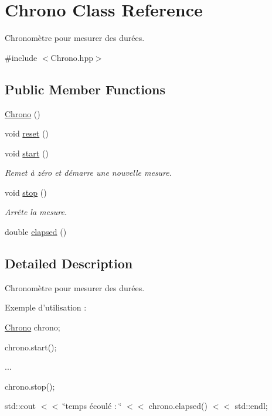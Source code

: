 \hypertarget{classChrono}{\section{Chrono Class Reference}
\label{classChrono}
}


Chronomètre pour mesurer des durées.  




{\ttfamily \#include $<$Chrono.\+hpp$>$}

\subsection*{Public Member Functions}
\begin{DoxyCompactItemize}
\item 
\hyperlink{classChrono_a3ac5e047174f389e7bd8aae71c6b5e8c}{Chrono} ()
\item 
void \hyperlink{classChrono_a027be23720616639bc610a98c53740ea}{reset} ()
\item 
void \hyperlink{classChrono_a25fa21b48125a6a811638aa6b8dcdbe8}{start} ()
\begin{DoxyCompactList}\small\item\em Remet à zéro et démarre une nouvelle mesure. \end{DoxyCompactList}\item 
void \hyperlink{classChrono_a7b8db2281381eac23da35a414077f3fd}{stop} ()
\begin{DoxyCompactList}\small\item\em Arrête la mesure. \end{DoxyCompactList}\item 
double \hyperlink{classChrono_aad4b00919a2eed1271259095a61b3096}{elapsed} ()
\end{DoxyCompactItemize}


\subsection{Detailed Description}
Chronomètre pour mesurer des durées. 

Exemple d'utilisation \+:

\hyperlink{classChrono}{Chrono} chrono;

chrono.\+start();

...

chrono.\+stop();

std\+::cout $<$$<$ \char`\"{}temps écoulé \+: \char`\"{} $<$$<$ chrono.\+elapsed() $<$$<$ std\+::endl; 

